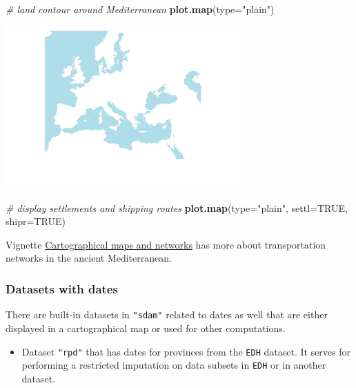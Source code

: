 \documentclass[a4paper,11pt]{memoir}
\newenvironment{Shaded}{\begin{snugshade}}{\end{snugshade}}
\newcommand{\CommentTok}[1]{\textcolor[rgb]{0.56,0.35,0.01}{\textit{#1}}}
\newcommand{\DataTypeTok}[1]{\textcolor[rgb]{0.13,0.29,0.53}{#1}}
\newcommand{\KeywordTok}[1]{\textcolor[rgb]{0.13,0.29,0.53}{\textbf{#1}}}
\newcommand{\NormalTok}[1]{#1}
\newcommand{\OtherTok}[1]{\textcolor[rgb]{0.56,0.35,0.01}{#1}}
\newcommand{\StringTok}[1]{\textcolor[rgb]{0.31,0.60,0.02}{#1}}
\providecommand{\tightlist}{%
  \setlength{\itemsep}{0pt}\setlength{\parskip}{0pt}}
\begin{document}
\begin{Shaded}
\begin{Highlighting}[]
\CommentTok{# land contour around Mediterranean}
\KeywordTok{plot.map}\NormalTok{(}\DataTypeTok{type=}\StringTok{"plain"}\NormalTok{)}
\end{Highlighting}
\end{Shaded}

{\centering
\includegraphics[width=9cm, trim=0 0 0 0, clip]{img/unnamed-chunk-18-1} %
}

\begin{Shaded}
\begin{Highlighting}[]
\CommentTok{# display settlements and shipping routes}
\KeywordTok{plot.map}\NormalTok{(}\DataTypeTok{type=}\StringTok{"plain"}\NormalTok{, }\DataTypeTok{settl=}\OtherTok{TRUE}\NormalTok{, }\DataTypeTok{shipr=}\OtherTok{TRUE}\NormalTok{)}
\end{Highlighting}
\end{Shaded}

Vignette \href{../doc/Maps.html}{Cartographical maps and networks} has
more about transportation networks in the ancient Mediterranean.

\hypertarget{datasets-with-dates}{%
\subsubsection{Datasets with dates}\label{datasets-with-dates}}

There are built-in datasets in \texttt{"sdam"} related to dates as well
that are either displayed in a cartographical map or used for other
computations.

\begin{itemize}
\tightlist
\item
  Dataset \texttt{"rpd"} that has dates for provinces from the
  \texttt{EDH} dataset. It serves for performing a restricted imputation
  on data subsets in \texttt{EDH} or in another dataset.
\end{itemize}
\end{document}

